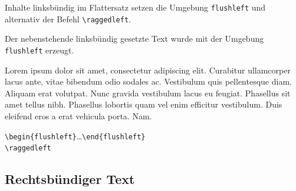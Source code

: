 \documentclass[a4paper,10pt,twoside]{scrbook}
\begin{document}
\begin{minipage}[t]{0.48\textwidth}
\setlength{\parskip}{1em}
\frenchspacing
Inhalte linksbündig im Flattersatz setzen die 
Umgebung \verb!flushleft! und alternativ der Befehl \verb!\raggedleft!.

Der nebenstehende linksbündig gesetzte Text wurde mit der Umgebung \verb!flushleft! erzeugt.
\end{minipage}
\hfill
\begin{minipage}[t]{0.48\textwidth}
\setlength{\parskip}{1em}
\frenchspacing
\begin{flushleft}
Lorem ipsum dolor sit amet, consectetur adipiscing elit. Curabitur ullamcorper lacus ante, vitae bibendum odio sodales ac. Vestibulum quis pellentesque diam. Aliquam erat volutpat. Nunc gravida vestibulum lacus eu feugiat. Phasellus sit amet tellus nibh. Phasellus lobortis quam vel enim efficitur vestibulum. Duis eleifend eros a erat vehicula porta. Nam.
\end{flushleft}
\end{minipage}




\begin{boxedminipage}{\textwidth}
\texttt{\textbackslash begin\{flushleft\}}\dots\texttt{\textbackslash end\{flushleft\}}\\
\texttt{\textbackslash raggedleft} 
\end{boxedminipage}


\subsection{Rechtsbündiger Text}
\end{document}
